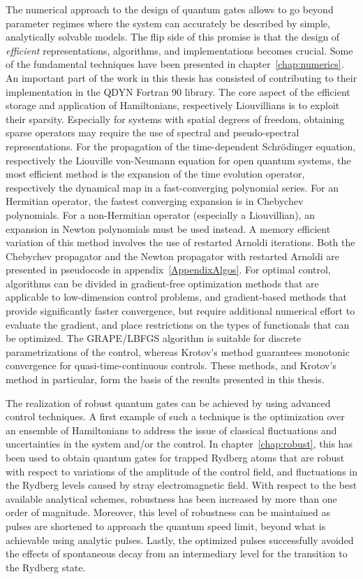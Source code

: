 The numerical approach to the design of quantum gates allows to go beyond
parameter regimes where the system can accurately be described by simple,
analytically solvable models. The flip side of this promise is that the design
of \emph{efficient} representations, algorithms, and implementations becomes
crucial. Some of the fundamental techniques have been presented in
chapter~\ref{chap:numerics}.
An important part of the work in this thesis has consisted of contributing to
their implementation in the QDYN Fortran 90 library.
The core aspect of the efficient storage and
application of Hamiltonians, respectively Liouvillians is to exploit their
sparsity. Especially for systems with spatial degrees of freedom, obtaining
sparse operators may require the use of spectral and pseudo-spectral
representations. For the propagation of the time-dependent Schrödinger equation,
respectively the Liouville von-Neumann equation for open quantum systems, the
most efficient method is the expansion of the time evolution operator,
respectively the dynamical map in a fast-converging polynomial series. For an
Hermitian operator, the fastest converging expansion is in Chebychev
polynomials. For a non-Hermitian operator (especially a Liouvillian), an
expansion in Newton polynomials must be used instead. A memory efficient
variation of this method involves the use of restarted Arnoldi iterations. Both
the Chebychev propagator and the Newton propagator with restarted Arnoldi are
presented in pseudocode in appendix~\ref{AppendixAlgos}. For optimal control,
algorithms can be divided in gradient-free optimization methods that are
applicable to low-dimension control problems, and gradient-based methods that
provide significantly faster convergence, but require additional numerical
effort to evaluate the gradient, and place restrictions on the types of
functionals that can be optimized. The GRAPE/LBFGS algorithm is suitable for
discrete parametrizations of the control, whereas Krotov's method
guarantees monotonic convergence for quasi-time-continuous controls.
These methods, and Krotov's method in particular, form the basis of the
results presented in this thesis.

The realization of robust quantum gates can be achieved by using advanced
control techniques. A first example of such a technique is the optimization over
an ensemble of Hamiltonians to address the issue of classical fluctuations and
uncertainties in the system and/or the control. In chapter~\ref{chap:robust},
this has been used to obtain quantum gates for trapped Rydberg atoms that are
robust with respect to  variations of the amplitude of the control field, and
fluctuations in the Rydberg levels caused by stray electromagnetic field. With
respect to the best available analytical schemes, robustness has been increased
by more than one order of magnitude. Moreover, this level of robustness can be
maintained as pulses are shortened to approach the quantum speed limit, beyond
what is achievable using analytic pulses. Lastly, the optimized pulses
successfully avoided the effects of spontaneous decay from an intermediary level
for the transition to the Rydberg state.

